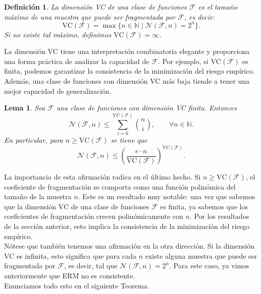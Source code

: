 \documentclass{article}
\newtheorem{lem}{Lema}[subsection]
\newtheorem{dfn}{Definición}[subsection]
\begin{document}
\begin{dfn}
La dimensión VC de una clase de funciones \(\mathcal{F}\) es el tamaño máximo de una muestra que puede ser fragmentada por \(\mathcal{F}\), es decir:
\[
\text{VC}(\mathcal{F}) = \max \{n \in \mathbb{N} \mid \mathcal{N}(\mathcal{F}, n) = 2^n\}.
\]
Si no existe tal máximo, definimos \(\text{VC}(\mathcal{F}) = \infty\). \\
\end{dfn}

La dimensión VC tiene una interpretación combinatoria 
elegante y proporciona una forma práctica de analizar la capacidad de \(\mathcal{F}\). Por ejemplo, si \(\text{VC}(\mathcal{F})\) 
es finita, podemos garantizar la consistencia de la minimización del riesgo empírico. Además, una clase de funciones 
con dimensión VC más baja tiende a tener una mejor capacidad de generalización.\\

\begin{lem}
    Sea $\mathcal{F}$ una clase de funciones con dimensión VC finita. Entonces
    \[
    \mathcal{N}(\mathcal{F}, n) \leq \sum_{i=0}^{\text{VC}(\mathcal{F})} \binom{n}{i} , \qquad \forall n \in \mathbb{N}.
    \]
    En particular, para $n\geq \text{VC}(\mathcal{F})$ se tiene que 
    \[
    \mathcal{N}(\mathcal{F}, n) \leq \left(\frac{e\cdot n}{\text{VC}(\mathcal{F})}\right)^{\text{VC}(\mathcal{F})}.
    \]
\end{lem}

La importancia de esta afirmación radica en el último hecho. Si \( n \geq \text{VC}(\mathcal{F}) \), 
el coeficiente de fragmentación se comporta como una función polinómica del tamaño de la muestra \( n \). 
Este es un resultado muy notable: una vez que sabemos que la dimensión VC de una clase de funciones 
\(\mathcal{F}\) es finita, ya sabemos que los coeficientes de fragmentación crecen polinómicamente con \( n \). 
Por los resultados de la sección anterior, esto implica la consistencia de la minimización del riesgo empírico.\\
Nótese que también tenemos una afirmación en la otra dirección. Si la dimensión VC es infinita, esto significa 
que para cada \( n \) existe alguna muestra que puede ser fragmentada por \(\mathcal{F}\), es decir, tal que
\(\mathcal{N}(\mathcal{F}, n) = 2^n. \) Para este caso, ya vimos anteriormente que ERM no es consistente.\\
Enunciamos todo esto en el siguiente Teorema.\\
\end{document}
